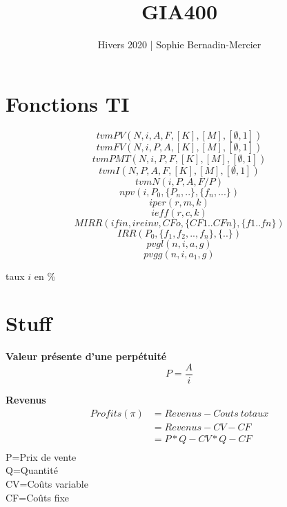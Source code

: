\documentclass[twocolumn,letterpaper]{article}
\title{GIA400}
\author{Hivers 2020 | Sophie Bernadin-Mercier}
\date{}
\begin{document}
\maketitle

\tableofcontents

\section{Fonctions TI}
$$tvmPV(N,i,A,F,[K],[M],[\emptyset,1])$$
$$tvmFV(N,i,P,A,[K],[M],[\emptyset,1])$$
$$tvmPMT(N,i,P,F,[K],[M],[\emptyset,1])$$
$$tvmI(N,P,A,F,[K],[M],[\emptyset,1])$$
$$tvmN(i,P,A,F/P)$$
$$npv(i,P_0,\{P_n,..\},\{f_n,...\})$$
$$iper(r,m,k)$$
$$ieff(r,c,k)$$
$$MIRR(ifin, ireinv, CFo, \{CF1..CFn\},\{f1..fn\})$$
$$IRR(P_0,\{f_1, f_2, .., f_n\},\{..\})$$
$$pvgl(n,i,a,g)$$
$$pvgg(n,i,a_1,g)$$

{\footnotesize *taux $i$ en \% }

\section{Stuff}
\begin{center}
\textbf{Valeur présente d'une perpétuité}
$$P=\frac{A}{i}$$

\textbf{Revenus}
\begin{equation*}
    \begin{split}
        Profits(\pi)&=Revenus - Couts\ totaux\\
        &=Revenus - CV - CF \\
        &=P*Q-CV*Q-CF\\    
    \end{split}
\end{equation*}
{\scriptsize P=Prix de vente\\Q=Quantité\\CV=Coûts variable\\CF=Coûts fixe}

\end{center}

\setcounter{section}{5}


\clearpage


\clearpage


\clearpage

\setcounter{section}{9}



\clearpage



\end{document}

